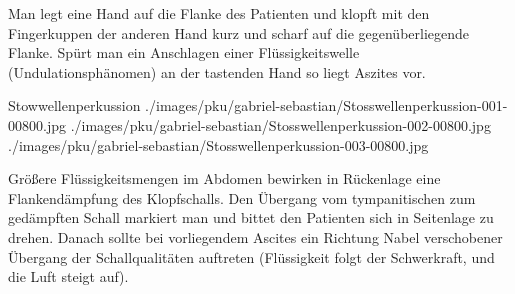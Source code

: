 {Man legt eine Hand auf die Flanke des Patienten und klopft mit den
Fingerkuppen der anderen Hand kurz und scharf auf die
gegenüberliegende Flanke. Spürt man ein Anschlagen einer
Flüssigkeitswelle (Undulationsphänomen) an der tastenden Hand so
liegt Aszites vor.

}
{
\begin{PkuBefunde}[]
  \item[\SymbolPkuNormal] 
\end{PkuBefunde}
}
{}
{}
{}


\begin{PictureSeriesWide}{}{Stowwellenperkussion}
{./images/pku/gabriel-sebastian/Stosswellenperkussion-001-00800.jpg}
{}
{./images/pku/gabriel-sebastian/Stosswellenperkussion-002-00800.jpg}
{}
{./images/pku/gabriel-sebastian/Stosswellenperkussion-003-00800.jpg}
{}
{}
{}
\end{PictureSeriesWide}


{Größere Flüssigkeitsmengen im Abdomen bewirken in Rückenlage
eine Flankendämpfung des Klopfschalls. Den Übergang vom
tympanitischen zum gedämpften Schall markiert man und bittet den
Patienten sich in Seitenlage zu drehen. Danach sollte bei vorliegendem
Ascites ein Richtung Nabel verschobener Übergang der
Schallqualitäten auftreten (Flüssigkeit folgt der Schwerkraft, und
die Luft steigt auf).}
{
\begin{PkuBefunde}[]
  \item[\SymbolPkuNormal] 
\end{PkuBefunde}
}
{}
{}
{}







